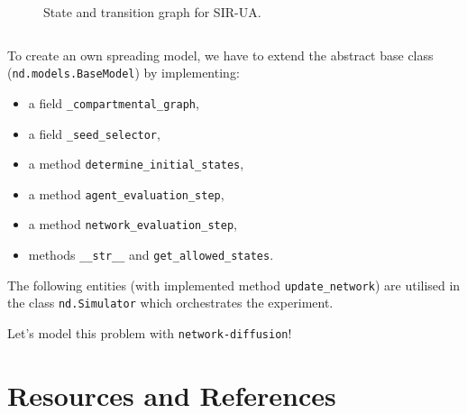 \documentclass{beamer}
\begin{document}
\begin{frame}{\secname}
\begin{columns}[T]
\begin{column}{0.5\textwidth}
\begin{figure}
            \caption{State and transition graph for SIR-UA.}
        \end{figure}
        \end{column}
      \end{columns}
\end{frame}

\begin{frame}{\secname}
    To create an own spreading model, we have to extend the abstract base class
    (\lstinline[style=py]{nd.models.BaseModel}) by implementing:
    \begin{itemize}
        \item a field \lstinline[style=py]{_compartmental_graph},
        \item a field \lstinline[style=py]{_seed_selector},
        \item a method \lstinline[style=py]{determine_initial_states},
        \item a method \lstinline[style=py]{agent_evaluation_step},
        \item a method \lstinline[style=py]{network_evaluation_step},
        \item methods \lstinline[style=py]{__str__} and \lstinline[style=py]{get_allowed_states}.
    \end{itemize}
    \vspace{1em}
    The following entities (with implemented method \lstinline[style=py]{update_network}) are
    utilised in the class \lstinline[style=py]{nd.Simulator} which orchestrates the experiment.
\end{frame}

\begin{frame}{\secname}
    \begin{center}
        \large Let's model this problem with \lstinline[style=py]{network-diffusion}!
    \end{center}
\end{frame}

\section{Resources and References}
\end{document}
